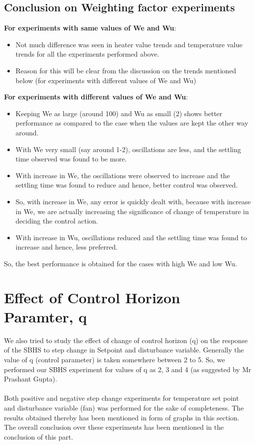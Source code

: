 \subsection{Conclusion on Weighting factor experiments}
\textbf{For experiments with same values of We and Wu}:
\begin{itemize}
\item Not much difference was seen in heater value trends and temperature value trends for all the experiments performed above.
\item Reason for this will be clear from the discussion on the trends mentioned below (for experiments with different values of We and Wu)
\end{itemize}
\textbf{For experiments with different values of We and Wu}:
\begin{itemize}
\item Keeping We as large (around 100) and Wu as small (2) shows better performance as compared to the case when the values are kept the other way around.
\item With We very small (say around 1-2), oscillations are less, and the settling time observed was found to be more.
\item With increase in We, the oscillations were observed to increase and the settling time was found to reduce and hence, better control was observed.
\item So, with increase in We, any error is quickly dealt with, because with increase in We, we are actually increasing the significance of change of temperature in deciding the control action.
\item With increase in Wu, oscillations reduced and the settling time was found to increase and hence, less preferred.
\end{itemize}
So, the best performance is obtained for the cases with high We and low Wu.


\section{Effect of Control Horizon Paramter, q}
We also tried to study the effect of change of control horizon (q) on the response of the SBHS to step change in Setpoint and disturbance variable. Generally the value of q (control parameter) is taken somewhere between 2 to 5. So, we performed our SBHS experiment for values of q as 2, 3 and 4 (as suggested by Mr Prashant Gupta). \\ \\
Both positive and negative step change experiments for temperature set point and disturbance variable (fan) was performed for the sake of completeness. The results obtained thereby has been mentioned in form of graphs in this section. The overall conclusion over these experiments has been mentioned in the conclusion of this part.

